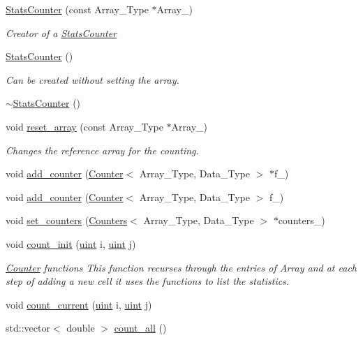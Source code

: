 \begin{DoxyCompactItemize}
\item 
\hyperlink{classbarry_1_1_stats_counter_a43e9fa90ef0b1fb716f0e75d1b803ef1}{Stats\+Counter} (const Array\+\_\+\+Type $\ast$Array\+\_\+)
\begin{DoxyCompactList}\small\item\em Creator of a {\ttfamily \hyperlink{classbarry_1_1_stats_counter}{Stats\+Counter}} \end{DoxyCompactList}\item 
\hyperlink{classbarry_1_1_stats_counter_a407df1580b207faac92c476c7062b840}{Stats\+Counter} ()
\begin{DoxyCompactList}\small\item\em Can be created without setting the array. \end{DoxyCompactList}\item 
\hyperlink{classbarry_1_1_stats_counter_a2824d86765d94e909e4b33396250b6c7}{$\sim$\+Stats\+Counter} ()
\item 
void \hyperlink{classbarry_1_1_stats_counter_a8dabc3a7a9931acbb76900a67d728f70}{reset\+\_\+array} (const Array\+\_\+\+Type $\ast$Array\+\_\+)
\begin{DoxyCompactList}\small\item\em Changes the reference array for the counting. \end{DoxyCompactList}\item 
void \hyperlink{classbarry_1_1_stats_counter_a829e41243a7b18cf71337deeec9f7030}{add\+\_\+counter} (\hyperlink{classbarry_1_1_counter}{Counter}$<$ Array\+\_\+\+Type, Data\+\_\+\+Type $>$ $\ast$f\+\_\+)
\item 
void \hyperlink{classbarry_1_1_stats_counter_ad175dcd2bd30d017881783de546ac333}{add\+\_\+counter} (\hyperlink{classbarry_1_1_counter}{Counter}$<$ Array\+\_\+\+Type, Data\+\_\+\+Type $>$ f\+\_\+)
\item 
void \hyperlink{classbarry_1_1_stats_counter_a1d66f7d7326cac60a46ee56a8eb0a497}{set\+\_\+counters} (\hyperlink{classbarry_1_1_counters}{Counters}$<$ Array\+\_\+\+Type, Data\+\_\+\+Type $>$ $\ast$counters\+\_\+)
\item 
void \hyperlink{classbarry_1_1_stats_counter_a19bd5936619e190c0d8918b4f343922e}{count\+\_\+init} (\hyperlink{namespacebarry_a11dfc53ddb4672278319aa04f1e09a6c}{uint} i, \hyperlink{namespacebarry_a11dfc53ddb4672278319aa04f1e09a6c}{uint} j)
\begin{DoxyCompactList}\small\item\em \hyperlink{classbarry_1_1_counter}{Counter} functions This function recurses through the entries of {\ttfamily Array} and at each step of adding a new cell it uses the functions to list the statistics. \end{DoxyCompactList}\item 
void \hyperlink{classbarry_1_1_stats_counter_ab81166f7cb67eeaecc469016d237019a}{count\+\_\+current} (\hyperlink{namespacebarry_a11dfc53ddb4672278319aa04f1e09a6c}{uint} i, \hyperlink{namespacebarry_a11dfc53ddb4672278319aa04f1e09a6c}{uint} j)
\item 
std\+::vector$<$ double $>$ \hyperlink{classbarry_1_1_stats_counter_a83bd92031a1499109c98f238221cbd67}{count\+\_\+all} ()
\end{DoxyCompactItemize}
